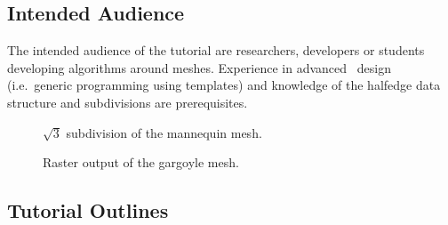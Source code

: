 \documentclass[twocolumn]{article}
\begin{document}

      


\subsection*{Intended Audience}

The intended audience of the tutorial are researchers, developers or
students developing algorithms around meshes. Experience in advanced
\CC\ design (i.e.\ generic programming using templates) and knowledge
of the halfedge data structure and subdivisions are prerequisites.

\begin{figure}[t]
    \caption{$\sqrt{3}$ subdivision of the mannequin mesh.}
    \label{fig:sqrt3}
\end{figure}

\begin{figure}[t]
    \caption{Raster output of the gargoyle mesh.}
    \label{fig:gargoyle:raster}
\end{figure}

\subsection*{Tutorial Outlines}

\end{document}
